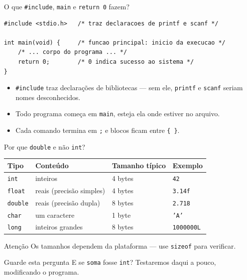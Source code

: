 \documentclass[aspectratio=169]{beamer}
\begin{document}
\begin{frame}[fragile]{O que \texttt{\#include}, \texttt{main} e \texttt{return 0} fazem?}
\begin{lstlisting}
#include <stdio.h>   /* traz declaracoes de printf e scanf */

int main(void) {     /* funcao principal: inicio da execucao */
    /* ... corpo do programa ... */
    return 0;        /* 0 indica sucesso ao sistema */
}
\end{lstlisting}
  \begin{itemize}
    \item \texttt{\#include} traz declarações de bibliotecas --- sem ele,
      \texttt{printf} e \texttt{scanf} seriam nomes desconhecidos.
    \item Todo programa começa em \texttt{main}, esteja ela onde estiver no arquivo.
    \item Cada comando termina em \texttt{;} e blocos ficam entre \texttt{\{ \}}.
  \end{itemize}
\end{frame}

\begin{frame}{Por que \texttt{double} e não \texttt{int}?}
  \begin{center}
  \small
  \begin{tabular}{llll}
    \toprule
    Tipo & Conteúdo & Tamanho típico & Exemplo \\
    \midrule
    \texttt{int} & inteiros & 4 bytes & \texttt{42} \\
    \texttt{float} & reais (precisão simples) & 4 bytes & \texttt{3.14f} \\
    \texttt{double} & reais (precisão dupla) & 8 bytes & \texttt{2.718} \\
    \texttt{char} & um caractere & 1 byte & \texttt{'A'} \\
    \texttt{long} & inteiros grandes & 8 bytes & \texttt{1000000L} \\
    \bottomrule
  \end{tabular}
  \end{center}
  \begin{alertblock}{Atenção}
    Os tamanhos dependem da plataforma --- use \texttt{sizeof} para verificar.
  \end{alertblock}
  \begin{exampleblock}{Guarde esta pergunta}
    E se \texttt{soma} fosse \texttt{int}? Testaremos daqui a pouco,
    modificando o programa.
  \end{exampleblock}
\end{frame}
\end{document}
